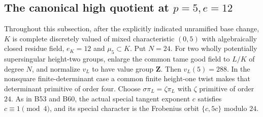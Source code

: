 \subsection{The canonical high quotient at \(p=5,e=12\)}

Throughout this subsection, after the explicitly indicated unramified
base change, $K$ is complete discretely valued of mixed characteristic
$(0,5)$ with algebraically closed residue field, $e_K=12$ and
$\mu_5\subset K$. Put $N=24$. For two wholly potentially supersingular
height-two groups, enlarge the common tame good field to $L/K$ of degree
$N$, and normalize $v_L$ to have value group $\mathbf Z$.
Then $v_L(5)=288$. In the nonsquare finite-determinant case a common
finite height-one twist makes that determinant primitive of order four.
Choose $\sigma\pi_L=\zeta\pi_L$ with $\zeta$ primitive of order $24$.
As in B53 and B60, the actual special tangent exponent $c$ satisfies
$c\equiv1\pmod4$, and its special character is the Frobenius orbit
$\{c,5c\}$ modulo $24$.

